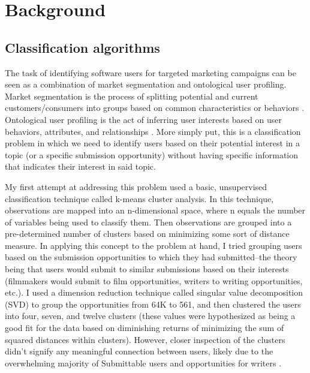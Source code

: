 \documentclass[]{report}   %
\begin{document}
\chapter{Background}
\section{Classification algorithms}

The task of identifying software users for targeted marketing campaigns can be seen as a combination of market segmentation and ontological user profiling. Market segmentation is the process of splitting potential and current customers/consumers into groups based on common characteristics or behaviors \cite{johnson_1971}. Ontological user profiling is the act of inferring user interests based on user behaviors, attributes, and relationships \cite{middleton_shadbolt_roure_2004}. More simply put, this is a classification problem in which we need to identify users based on their potential interest in a topic (or a specific submission opportunity) without having specific information that indicates their interest in said topic. 

My first attempt at addressing this problem used a basic, unsupervised classification technique called k-means cluster analysis. In this technique, observations are mapped into an n-dimensional space, where n equals the number of variables being used to classify them. Then observations are grouped into a pre-determined number of clusters based on minimizing some sort of distance measure\cite{jain_2010}. In applying this concept to the problem at hand, I tried grouping users based on the submission opportunities to which they had submitted--the theory being that users would submit to similar submissions based on their interests (filmmakers would submit to film opportunities, writers to writing opportunities, etc.). I used a dimension reduction technique called singular value decomposition (SVD) to group the opportunities from 64K to 561, and then clustered the users into four, seven, and twelve clusters (these values were hypothesized as being a good fit for the data based on diminishing returns of minimizing the sum of squared distances within clusters). However, closer inspection of the clusters didn't signify any meaningful connection between users, likely due to the overwhelming majority of Submittable users and opportunities for writers \cite{marbut_2018}.
\end{document}
